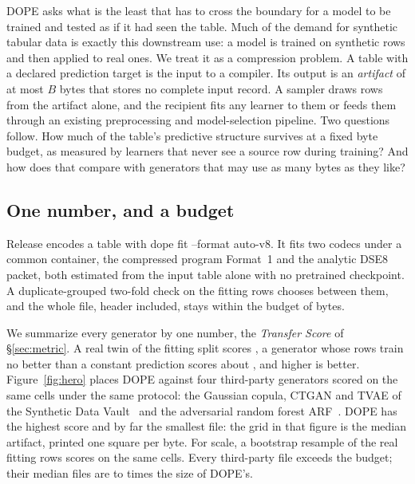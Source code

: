 \documentclass[10pt,letterpaper,twocolumn]{article}
\newcommand{\cli}[1]{{\ttfamily\fontsize{8.9}{11}\selectfont #1}}
\begin{document}
DOPE asks what is the least that has to cross the boundary for a model to be trained and tested as if it had seen the table. Much of the demand for synthetic tabular data is exactly this downstream use: a model is trained on synthetic rows and then applied to real ones. We treat it as a compression problem. A table with a declared prediction target is the input to a compiler. Its output is an \emph{artifact} of at most $B$ bytes that stores no complete input record. A sampler draws rows from the artifact alone, and the recipient fits any learner to them or feeds them through an existing preprocessing and model-selection pipeline. Two questions follow. How much of the table's predictive structure survives at a fixed byte budget, as measured by learners that never see a source row during training? And how does that compare with generators that may use as many bytes as they like?

\subsection{One number, and a budget}
Release  encodes a table with \cli{dope fit --format auto-v8}. It fits two codecs under a common container, the compressed program Format~1 and the analytic \cli{DSE8} packet, both estimated from the input table alone with no pretrained checkpoint. A duplicate-grouped two-fold check on the fitting rows chooses between them, and the whole file, header included, stays within the budget of  bytes.

We summarize every generator by one number, the \emph{Transfer Score} of \S\ref{sec:metric}. A real twin of the fitting split scores , a generator whose rows train no better than a constant prediction scores about , and higher is better. Figure~\ref{fig:hero} places DOPE against four third-party generators scored on the same cells under the same protocol: the Gaussian copula, CTGAN and TVAE of the Synthetic Data Vault~\cite{patki2016sdv,xu2019ctgan} and the adversarial random forest ARF~\cite{watson2023arf}. DOPE has the highest score and by far the smallest file: the grid in that figure is the median artifact, printed one square per byte. For scale, a bootstrap resample of the real fitting rows scores  on the same cells. Every third-party file exceeds the budget; their median files are  to  times the size of DOPE's.
\end{document}
